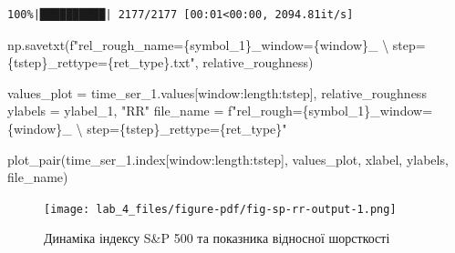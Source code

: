 \documentclass[
  letterpaper,
]{report}
\newenvironment{Shaded}{\begin{snugshade}}{\end{snugshade}}
\newcommand{\CharTok}[1]{\textcolor[rgb]{0.13,0.47,0.30}{#1}}
\newcommand{\NormalTok}[1]{\textcolor[rgb]{0.00,0.23,0.31}{#1}}
\newcommand{\OperatorTok}[1]{\textcolor[rgb]{0.37,0.37,0.37}{#1}}
\newcommand{\SpecialCharTok}[1]{\textcolor[rgb]{0.37,0.37,0.37}{#1}}
\newcommand{\SpecialStringTok}[1]{\textcolor[rgb]{0.13,0.47,0.30}{#1}}
\newcommand{\StringTok}[1]{\textcolor[rgb]{0.13,0.47,0.30}{#1}}
\begin{document}
\begin{verbatim}
100%|██████████| 2177/2177 [00:01<00:00, 2094.81it/s]
\end{verbatim}

\begin{Shaded}
\begin{Highlighting}[]
\NormalTok{np.savetxt(}\SpecialStringTok{f"rel\_rough\_name=}\SpecialCharTok{\{}\NormalTok{symbol\_1}\SpecialCharTok{\}}\SpecialStringTok{\_window=}\SpecialCharTok{\{}\NormalTok{window}\SpecialCharTok{\}}\SpecialStringTok{\_ }\CharTok{\textbackslash{}}
\SpecialStringTok{    step=}\SpecialCharTok{\{}\NormalTok{tstep}\SpecialCharTok{\}}\SpecialStringTok{\_rettype=}\SpecialCharTok{\{}\NormalTok{ret\_type}\SpecialCharTok{\}}\SpecialStringTok{.txt"}\NormalTok{, relative\_roughness)}
\end{Highlighting}
\end{Shaded}

\begin{Shaded}
\begin{Highlighting}[]
\NormalTok{values\_plot }\OperatorTok{=}\NormalTok{ time\_ser\_1.values[window:length:tstep], relative\_roughness}
\NormalTok{ylabels }\OperatorTok{=}\NormalTok{ ylabel\_1, }\StringTok{"RR"}
\NormalTok{file\_name }\OperatorTok{=} \SpecialStringTok{f"rel\_rough=}\SpecialCharTok{\{}\NormalTok{symbol\_1}\SpecialCharTok{\}}\SpecialStringTok{\_window=}\SpecialCharTok{\{}\NormalTok{window}\SpecialCharTok{\}}\SpecialStringTok{\_ }\CharTok{\textbackslash{}}
\SpecialStringTok{    step=}\SpecialCharTok{\{}\NormalTok{tstep}\SpecialCharTok{\}}\SpecialStringTok{\_rettype=}\SpecialCharTok{\{}\NormalTok{ret\_type}\SpecialCharTok{\}}\SpecialStringTok{"}
\end{Highlighting}
\end{Shaded}

\begin{Shaded}
\begin{Highlighting}[]
\NormalTok{plot\_pair(time\_ser\_1.index[window:length:tstep], values\_plot, }
\NormalTok{            xlabel, ylabels, file\_name)}
\end{Highlighting}
\end{Shaded}

\begin{figure}[H]

{\centering \texttt{[image: lab\_4\_files/figure-pdf/fig-sp-rr-output-1.png]}

}

\caption{\label{fig-sp-rr}Динаміка індексу S\&P 500 та показника
відносної шорсткості}

\end{figure}
\end{document}
